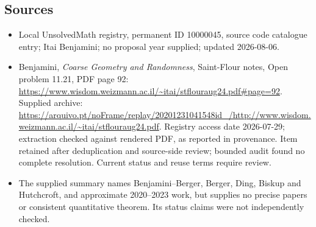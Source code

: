 \documentclass[11pt]{article}
\begin{document}
\subsection{Sources}
\begin{itemize}
\item Local UnsolvedMath registry, permanent ID 10000045, source code catalogue entry; Itai Benjamini; no proposal year supplied; updated 2026-08-06.
\item Benjamini, \emph{Coarse Geometry and Randomness}, Saint-Flour notes, Open problem 11.21, PDF page 92: \url{https://www.wisdom.weizmann.ac.il/~itai/stflouraug24.pdf#page=92}. Supplied archive: \url{https://arquivo.pt/noFrame/replay/20201231041548id_/http://www.wisdom.weizmann.ac.il/~itai/stflouraug24.pdf}. Registry access date 2026-07-29; extraction checked against rendered PDF, as reported in provenance. Item retained after deduplication and source-side review; bounded audit found no complete resolution. Current status and reuse terms require review.
\item The supplied summary names Benjamini--Berger, Berger, Ding, Biskup and Hutchcroft, and approximate 2020--2023 work, but supplies no precise papers or consistent quantitative theorem. Its status claims were not independently checked.
\end{itemize}
\end{document}
